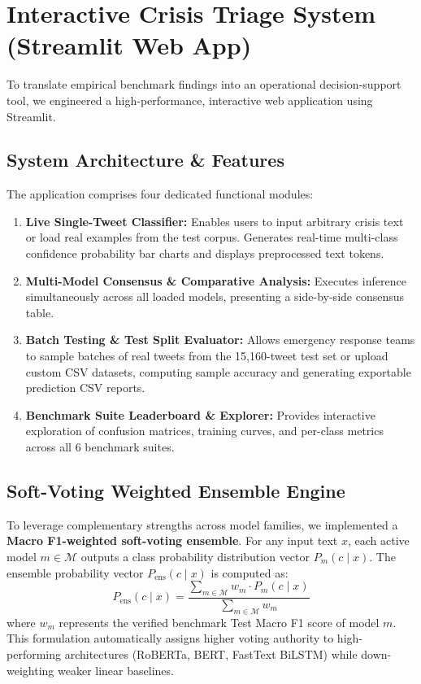 \documentclass[12pt,a4paper]{article}
\begin{document}
\section{Interactive Crisis Triage System (Streamlit Web App)}

To translate empirical benchmark findings into an operational decision-support tool, we engineered a high-performance, interactive web application using Streamlit.

\subsection{System Architecture \& Features}
The application comprises four dedicated functional modules:
\begin{enumerate}
    \item \textbf{Live Single-Tweet Classifier:} Enables users to input arbitrary crisis text or load real examples from the test corpus. Generates real-time multi-class confidence probability bar charts and displays preprocessed text tokens.
    \item \textbf{Multi-Model Consensus \& Comparative Analysis:} Executes inference simultaneously across all loaded models, presenting a side-by-side consensus table.
    \item \textbf{Batch Testing \& Test Split Evaluator:} Allows emergency response teams to sample batches of real tweets from the 15,160-tweet test set or upload custom CSV datasets, computing sample accuracy and generating exportable prediction CSV reports.
    \item \textbf{Benchmark Suite Leaderboard \& Explorer:} Provides interactive exploration of confusion matrices, training curves, and per-class metrics across all 6 benchmark suites.
\end{enumerate}

\subsection{Soft-Voting Weighted Ensemble Engine}
To leverage complementary strengths across model families, we implemented a \textbf{Macro F1-weighted soft-voting ensemble}. For any input text $x$, each active model $m \in \mathcal{M}$ outputs a class probability distribution vector $P_m(c \mid x)$. The ensemble probability vector $P_{\text{ens}}(c \mid x)$ is computed as:
\begin{equation}
    P_{\text{ens}}(c \mid x) = \frac{\sum_{m \in \mathcal{M}} w_m \cdot P_m(c \mid x)}{\sum_{m \in \mathcal{M}} w_m}
\end{equation}
where $w_m$ represents the verified benchmark Test Macro F1 score of model $m$. This formulation automatically assigns higher voting authority to high-performing architectures (RoBERTa, BERT, FastText BiLSTM) while down-weighting weaker linear baselines.
\end{document}
